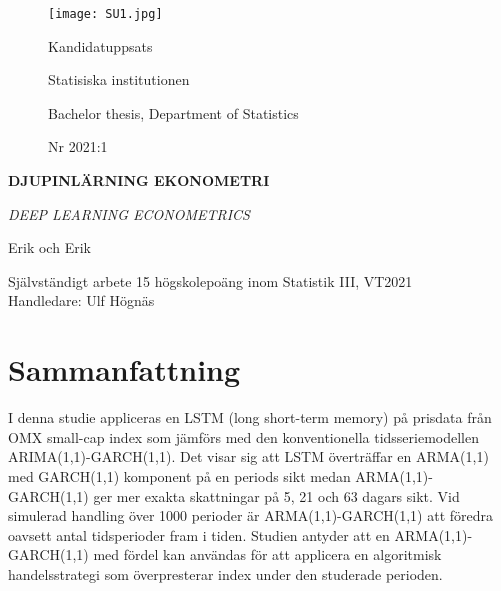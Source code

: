 \documentclass[11pt]{article}
\begin{document}
\begin{titlepage}
\thispagestyle{empty}
	\begin{figure}[ht]
			\texttt{[image: SU1.jpg]}
			
	   \endminipage
		 Kandidatuppsats \par
		 Statisiska institutionen \par
		 Bachelor thesis, Department of Statistics \par
		 Nr 2021:1 \par
			
\endminipage
\end{figure}
	
	
\centering
\vspace{5cm}

{\large\bfseries DJUPINLÄRNING EKONOMETRI\par}
	\vspace{0.5cm}
	
{\large\itshape DEEP LEARNING ECONOMETRICS \par}
	\vfill
	
	

{\Large Erik och Erik\par}
	\vspace{0.5cm}
	
\begin{flushleft}
Självständigt arbete 15 högskolepoäng inom Statistik III, VT2021 \\
Handledare: Ulf Högnäs\\

\end{flushleft}
\end{titlepage}


\newpage
\thispagestyle{empty}
\section*{Sammanfattning}

I denna studie appliceras en LSTM (long short-term memory) på prisdata från OMX small-cap index som jämförs med den konventionella tidsseriemodellen ARIMA(1,1)-GARCH(1,1). Det visar sig att LSTM överträffar en ARMA(1,1) med GARCH(1,1) komponent på en periods sikt medan ARMA(1,1)-GARCH(1,1) ger mer exakta skattningar på 5, 21 och 63 dagars sikt. Vid simulerad handling över 1000 perioder är ARMA(1,1)-GARCH(1,1) att föredra oavsett antal tidsperioder fram i tiden. Studien antyder att en ARMA(1,1)-GARCH(1,1) med fördel kan användas för att applicera en algoritmisk handelsstrategi som överpresterar index under den studerade perioden. 
\end{document}
